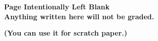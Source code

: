 \documentclass[letterpaper]{article}
\newcommand{\real}{\mathbb R}  %
\begin{document}
\begin{enumerate}

\end{enumerate}

\newpage

\begin{center}
\vspace*{6cm}

{\bf \LARGE Page Intentionally Left Blank}\\

\vspace*{3cm}
\textbf{Anything written here will not be graded.}

\textbf{(You can use it for scratch paper.)}

\end{center}
\end{document}
